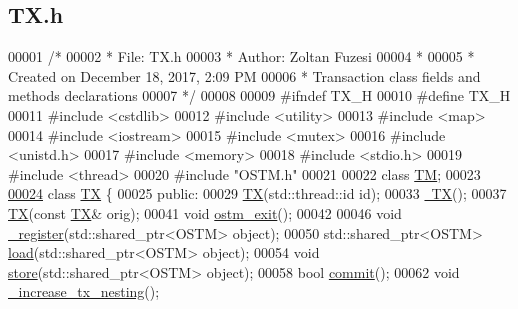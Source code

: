 \hypertarget{_t_x_8h_source}{}\subsection{T\+X.\+h}

\begin{DoxyCode}
00001 \textcolor{comment}{/* }
00002 \textcolor{comment}{ * File:   TX.h}
00003 \textcolor{comment}{ * Author: Zoltan Fuzesi}
00004 \textcolor{comment}{ * }
00005 \textcolor{comment}{ * Created on December 18, 2017, 2:09 PM}
00006 \textcolor{comment}{ * Transaction class fields and methods declarations}
00007 \textcolor{comment}{ */}
00008 
00009 \textcolor{preprocessor}{#ifndef TX\_H}
00010 \textcolor{preprocessor}{#define TX\_H}
00011 \textcolor{preprocessor}{#include <cstdlib>}
00012 \textcolor{preprocessor}{#include <utility>}
00013 \textcolor{preprocessor}{#include <map>}
00014 \textcolor{preprocessor}{#include <iostream>}
00015 \textcolor{preprocessor}{#include <mutex>}
00016 \textcolor{preprocessor}{#include <unistd.h>}
00017 \textcolor{preprocessor}{#include <memory>}
00018 \textcolor{preprocessor}{#include <stdio.h>}
00019 \textcolor{preprocessor}{#include <thread>}
00020 \textcolor{preprocessor}{#include "OSTM.h"}
00021 
00022 \textcolor{keyword}{class }\hyperlink{class_t_m}{TM};
00023 
\hypertarget{_t_x_8h_source.tex_l00024}{}\hyperlink{class_t_x}{00024} \textcolor{keyword}{class }\hyperlink{class_t_x}{TX} \{
00025 \textcolor{keyword}{public}:
00029     \hyperlink{class_t_x_a8a4b83eab0171ae834bfa92bbced1094}{TX}(std::thread::id \textcolor{keywordtype}{id});
00033     \hyperlink{class_t_x_abecf854cc3228ab6dd51175b3cd1c70a}{~TX}();
00037     \hyperlink{class_t_x_a8a4b83eab0171ae834bfa92bbced1094}{TX}(\textcolor{keyword}{const} \hyperlink{class_t_x}{TX}& orig);
00041     \textcolor{keywordtype}{void} \hyperlink{class_t_x_aa9739c5c2077454c779098db7baefc2b}{ostm\_exit}();
00042     
00046     \textcolor{keywordtype}{void} \hyperlink{class_t_x_abc32af2f51df97ac483e5bfe7db6ca6e}{\_register}(std::shared\_ptr<OSTM>  \textcolor{keywordtype}{object});
00050     std::shared\_ptr<OSTM>  \hyperlink{class_t_x_a1d78262b8831ddd042ed491f2e600e24}{load}(std::shared\_ptr<OSTM>  \textcolor{keywordtype}{object});
00054     \textcolor{keywordtype}{void} \hyperlink{class_t_x_a7dbcb369aa4a3370b6c6829d278ece5d}{store}(std::shared\_ptr<OSTM>  \textcolor{keywordtype}{object});
00058     \textcolor{keywordtype}{bool} \hyperlink{class_t_x_a9dde5d356b35e557448e58d260087356}{commit}();
00062     \textcolor{keywordtype}{void} \hyperlink{class_t_x_a1384bdf12d795854b5d32e7f61ffbdb8}{\_increase\_tx\_nesting}();

\end{DoxyCode}
